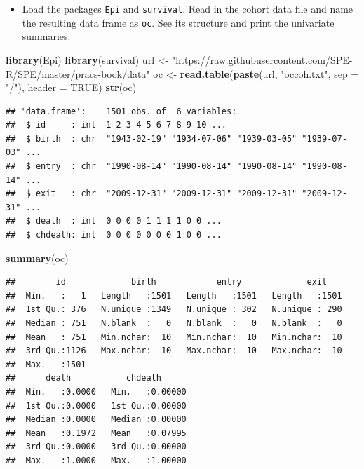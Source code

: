 \documentclass[
]{book}
\newenvironment{Shaded}{\begin{snugshade}}{\end{snugshade}}
\newcommand{\AttributeTok}[1]{\textcolor[rgb]{0.13,0.29,0.53}{#1}}
\newcommand{\ConstantTok}[1]{\textcolor[rgb]{0.56,0.35,0.01}{#1}}
\newcommand{\FunctionTok}[1]{\textcolor[rgb]{0.13,0.29,0.53}{\textbf{#1}}}
\newcommand{\NormalTok}[1]{#1}
\newcommand{\OtherTok}[1]{\textcolor[rgb]{0.56,0.35,0.01}{#1}}
\newcommand{\StringTok}[1]{\textcolor[rgb]{0.31,0.60,0.02}{#1}}
\providecommand{\tightlist}{%
  \setlength{\itemsep}{0pt}\setlength{\parskip}{0pt}}
\theoremstyle{definition}
\theoremstyle{definition}
\theoremstyle{definition}
\theoremstyle{definition}
\theoremstyle{remark}
\begin{document}
\begin{itemize}
\tightlist
\item
  Load the packages \texttt{Epi} and \texttt{survival}.
  Read in the cohort data file and name
  the resulting data frame as \texttt{oc}.
  See its structure and print the univariate summaries.
\end{itemize}

\begin{Shaded}
\begin{Highlighting}[]
\FunctionTok{library}\NormalTok{(Epi)}
\FunctionTok{library}\NormalTok{(survival)}
\NormalTok{url }\OtherTok{\textless{}{-}} \StringTok{"https://raw.githubusercontent.com/SPE{-}R/SPE/master/pracs{-}book/data"}
\NormalTok{oc }\OtherTok{\textless{}{-}} \FunctionTok{read.table}\NormalTok{(}\FunctionTok{paste}\NormalTok{(url, }\StringTok{"occoh.txt"}\NormalTok{, }\AttributeTok{sep =} \StringTok{"/"}\NormalTok{), }\AttributeTok{header =} \ConstantTok{TRUE}\NormalTok{)}
\FunctionTok{str}\NormalTok{(oc)}
\end{Highlighting}
\end{Shaded}

\begin{verbatim}
## 'data.frame':    1501 obs. of  6 variables:
##  $ id     : int  1 2 3 4 5 6 7 8 9 10 ...
##  $ birth  : chr  "1943-02-19" "1934-07-06" "1939-03-05" "1939-07-03" ...
##  $ entry  : chr  "1990-08-14" "1990-08-14" "1990-08-14" "1990-08-14" ...
##  $ exit   : chr  "2009-12-31" "2009-12-31" "2009-12-31" "2009-12-31" ...
##  $ death  : int  0 0 0 0 1 1 1 1 0 0 ...
##  $ chdeath: int  0 0 0 0 0 0 0 1 0 0 ...
\end{verbatim}

\begin{Shaded}
\begin{Highlighting}[]
\FunctionTok{summary}\NormalTok{(oc)}
\end{Highlighting}
\end{Shaded}

\begin{verbatim}
##        id             birth            entry             exit     
##  Min.   :   1   Length   :1501   Length   :1501   Length   :1501  
##  1st Qu.: 376   N.unique :1349   N.unique : 302   N.unique : 290  
##  Median : 751   N.blank  :   0   N.blank  :   0   N.blank  :   0  
##  Mean   : 751   Min.nchar:  10   Min.nchar:  10   Min.nchar:  10  
##  3rd Qu.:1126   Max.nchar:  10   Max.nchar:  10   Max.nchar:  10  
##  Max.   :1501                                                     
##      death           chdeath       
##  Min.   :0.0000   Min.   :0.00000  
##  1st Qu.:0.0000   1st Qu.:0.00000  
##  Median :0.0000   Median :0.00000  
##  Mean   :0.1972   Mean   :0.07995  
##  3rd Qu.:0.0000   3rd Qu.:0.00000  
##  Max.   :1.0000   Max.   :1.00000
\end{verbatim}
\end{document}
